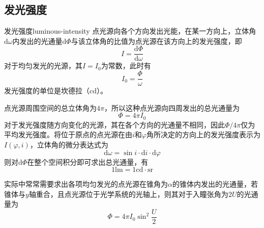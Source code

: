 \documentclass[cn,10pt,chinesefont=founder,math=newtx,cite=super,twoside]{elegantbook}
\begin{document}
\subsection{发光强度}
\begin{definition}{发光强度}{luminous-intensity}
点光源向各个方向发出光能，在某一方向上，立体角$\mathrm{d}\omega$内发出的光通量$\mathrm{d}\varPhi$与该立体角的比值为点光源在该方向上的发光强度，即
\begin{equation}
I=\frac{\mathrm{d}\varPhi}{\mathrm{d}\omega}
\end{equation}
对于均匀发光的光源，其$I=I_0$为常数，此时有
\begin{equation}
I_0=\frac{\varPhi}{\omega}
\end{equation}
发光强度的单位是坎德拉（$\mathrm{cd}$）。
\end{definition}
点光源周围空间的总立体角为$4\pi$，所以这种点光源向四周发出的总光通量为
\begin{equation}
\varPhi=4\pi I_0
\end{equation}
对于发光强度随方向变化的光源，其在各个方向的光通量不相同，因此$\varPhi/4\pi$仅为平均发光强度。将位于原点的点光源在由$i$和$\varphi$角所决定的方向上的发光强度表示为$I(\varphi,i)$，立体角的微分表达式为
\begin{equation}
\mathrm{d}\omega=\sin i\cdot\mathrm{d}i\cdot\mathrm{d}\varphi
\end{equation}
则对$\mathrm{d}\varPhi$在整个空间积分即可求出总光通量，有
\begin{equation}
1\mathrm{lm}=1\mathrm{cd}\cdot\mathrm{sr}
\end{equation}
\begin{note}
	实际中常常需要求出各项均匀发光的点光源在锥角为$\alpha$的锥体内发出的光通量，若锥体与$y$轴重合，且点光源位于光学系统的光轴上，则其对于入瞳张角为$2U$的光通量为
	\begin{equation}
	\varPhi=4\pi I_0\sin^2\frac{U}{2}
	\end{equation}
\end{note}
\end{document}
